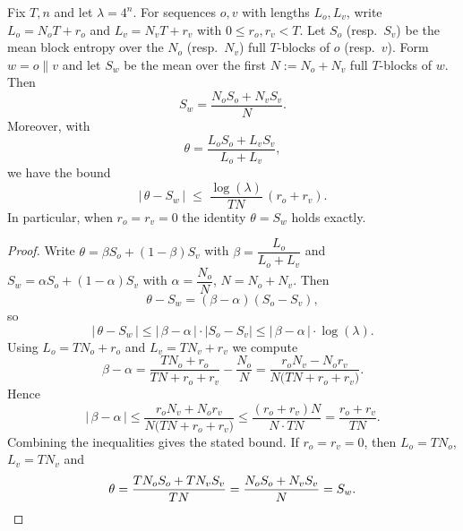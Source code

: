 \documentclass[10pt,a4paper]{amsart}
\begin{document}
\begin{Theorem}
\label{thm:1}
Fix $T,n$ and let $\lambda=4^n$. For sequences $o,v$ with lengths
$L_o,L_v$, write $L_o=N_oT+r_o$ and $L_v=N_vT+r_v$ with $0\le r_o,r_v<T$.
Let $S_o$ (resp.\ $S_v$) be the mean block entropy over the $N_o$ (resp.\ $N_v$) full $T$-blocks of $o$ (resp.\ $v$).
Form $w=o\|v$ and let $S_w$ be the mean over the first $N:=N_o+N_v$ full $T$-blocks of $w$.
Then
\begin{equation}
S_w=\frac{N_oS_o+N_vS_v}{N}.
\end{equation}
Moreover, with
\begin{equation}
\theta=\frac{L_oS_o+L_vS_v}{L_o+L_v},
\end{equation}
we have the bound
\begin{equation}
\bigl|\,\theta-S_w\,\bigr|\;\le\;\frac{\log(\lambda)}{TN}\,(r_o+r_v).
\end{equation}
In particular, when $r_o=r_v=0$ the identity $\theta=S_w$ holds exactly.
\end{Theorem}

\begin{proof}
Write $\theta=\beta S_o+(1-\beta)S_v$ with $\beta=\dfrac{L_o}{L_o+L_v}$ and
$S_w=\alpha S_o+(1-\alpha)S_v$ with $\alpha=\dfrac{N_o}{N}$, $N=N_o+N_v$.
Then
\begin{equation}
\theta-S_w=(\beta-\alpha)(S_o-S_v),
\end{equation}
so
\begin{equation}
\bigl|\,\theta-S_w\,\bigr|\le |\,\beta-\alpha\,|\cdot\bigl|S_o-S_v\bigr|\le |\,\beta-\alpha\,|\cdot\log(\lambda).
\end{equation}
Using $L_o=TN_o+r_o$ and $L_v=TN_v+r_v$ we compute
\begin{equation}
\beta-\alpha
=\frac{TN_o+r_o}{TN+r_o+r_v}-\frac{N_o}{N}
=\frac{r_oN_v-N_or_v}{N\bigl(TN+r_o+r_v\bigr)}.
\end{equation}
Hence
\begin{equation}
|\,\beta-\alpha\,|
\le \frac{r_oN_v+N_or_v}{N\bigl(TN+r_o+r_v\bigr)}
\le \frac{(r_o+r_v)N}{N\cdot TN}
=\frac{r_o+r_v}{TN}.
\end{equation}
Combining the inequalities gives the stated bound. If $r_o=r_v=0$, then $L_o=TN_o$, $L_v=TN_v$ and
\begin{equation}
\theta=\frac{TN_oS_o+TN_vS_v}{TN}=\frac{N_oS_o+N_vS_v}{N}=S_w.\qedhere
\end{equation}
\end{proof}
\end{document}
